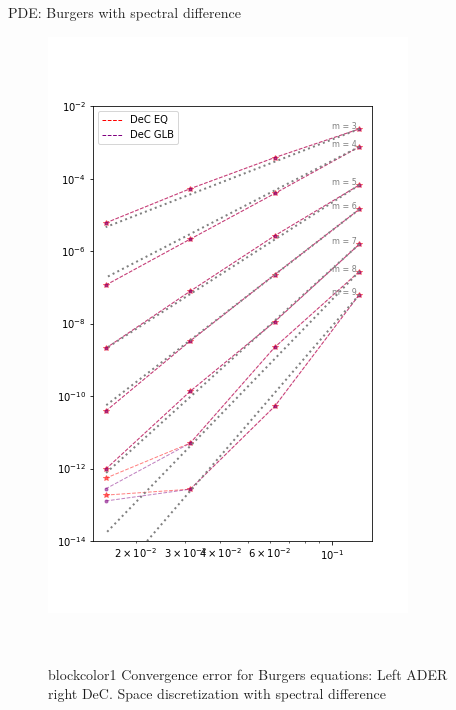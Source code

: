 \documentclass[9pt,compress,t,aspectratio=169]{beamer}
\begin{document}
\begin{frame}{PDE: Burgers with spectral difference}
\begin{figure}
\begin{center}
\begin{minipage}{0.35\textwidth}
		\includegraphics[width=\textwidth,trim={0 55 0 60},clip]{burgers_temp_dec.png}
\end{minipage}\,
	\begin{minipage}{0.25\textwidth}
	\begin{beamercolorbox}[sep=1em,wd=\textwidth]{blockcolor1}
		Convergence error for Burgers equations: Left ADER right DeC. Space discretization with spectral difference
	\end{beamercolorbox}
\end{minipage}
\end{center}
\end{figure}

\end{frame}
\end{document}
